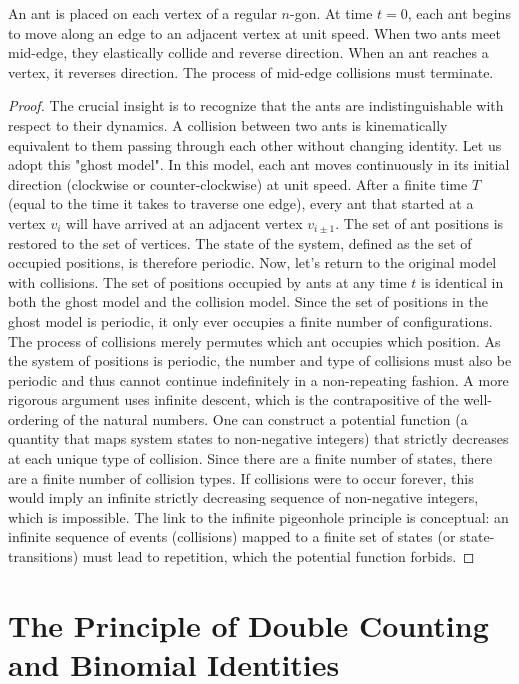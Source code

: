 \begin{proposition}
An ant is placed on each vertex of a regular $n$-gon. At time $t=0$, each ant begins to move along an edge to an adjacent vertex at unit speed. When two ants meet mid-edge, they elastically collide and reverse direction. When an ant reaches a vertex, it reverses direction. The process of mid-edge collisions must terminate.
\end{proposition}
\begin{proof}
The crucial insight is to recognize that the ants are indistinguishable with respect to their dynamics. A collision between two ants is kinematically equivalent to them passing through each other without changing identity. Let us adopt this "ghost model". In this model, each ant moves continuously in its initial direction (clockwise or counter-clockwise) at unit speed.
After a finite time $T$ (equal to the time it takes to traverse one edge), every ant that started at a vertex $v_i$ will have arrived at an adjacent vertex $v_{i \pm 1}$. The set of ant positions is restored to the set of vertices. The state of the system, defined as the set of occupied positions, is therefore periodic.
Now, let's return to the original model with collisions. The set of positions occupied by ants at any time $t$ is identical in both the ghost model and the collision model. Since the set of positions in the ghost model is periodic, it only ever occupies a finite number of configurations. The process of collisions merely permutes which ant occupies which position. As the system of positions is periodic, the number and type of collisions must also be periodic and thus cannot continue indefinitely in a non-repeating fashion.
A more rigorous argument uses infinite descent, which is the contrapositive of the well-ordering of the natural numbers. One can construct a potential function (a quantity that maps system states to non-negative integers) that strictly decreases at each unique type of collision. Since there are a finite number of states, there are a finite number of collision types. If collisions were to occur forever, this would imply an infinite strictly decreasing sequence of non-negative integers, which is impossible. The link to the infinite pigeonhole principle is conceptual: an infinite sequence of events (collisions) mapped to a finite set of states (or state-transitions) must lead to repetition, which the potential function forbids.
\end{proof}

\section{The Principle of Double Counting and Binomial Identities}

